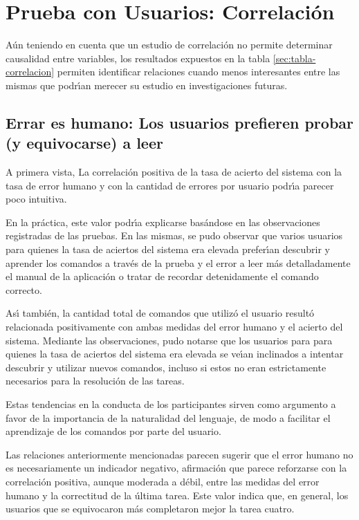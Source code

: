 \section{Prueba con Usuarios: Correlaci\'on}
A\'un teniendo en cuenta que un estudio de correlaci\'on no permite determinar causalidad
entre variables, los resultados expuestos en la tabla \ref{sec:tabla-correlacion} 
permiten identificar relaciones cuando menos interesantes entre las mismas que podr{{\'\i}}an
merecer su estudio en investigaciones futuras.

\subsection[Errar es humano: Los usuarios prefieren probar (y equivocarse) a leer]
{Errar es humano: Los usuarios prefieren probar \\ (y equivocarse) a leer}
A primera vista, La correlaci\'on positiva de la tasa de acierto del sistema con la
tasa de error humano y con la cantidad de errores por usuario podr{{\'\i}}a parecer
poco intuitiva.

En la pr\'actica, este valor podr{{\'\i}}a explicarse bas\'andose en las observaciones registradas 
de las pruebas. En las mismas, se pudo observar que varios usuarios para quienes la tasa de
aciertos del sistema era elevada prefer{{\'\i}}an descubrir y aprender los comandos a trav\'es
de la prueba y el error a leer m\'as detalladamente el manual de la aplicaci\'on o tratar de
recordar detenidamente el comando correcto.

As{{\'\i}} tambi\'en, la cantidad total de comandos que utiliz\'o el usuario result\'o relacionada
positivamente con ambas medidas del error humano y el acierto del sistema. Mediante las 
observaciones, pudo notarse que los usuarios para para quienes la tasa de
aciertos del sistema era elevada se ve{{\'\i}}an inclinados a intentar descubrir y utilizar nuevos
comandos, incluso si estos no eran estrictamente necesarios para la resoluci\'on de las tareas.

Estas tendencias en la conducta de los participantes sirven como argumento a favor de la importancia 
de la naturalidad del lenguaje, de modo a facilitar el aprendizaje de los comandos por parte del usuario.

Las relaciones anteriormente mencionadas parecen sugerir que el error humano no es necesariamente
un indicador negativo, afirmaci\'on que parece reforzarse con la correlaci\'on positiva, aunque moderada
a d\'ebil, entre las medidas del error humano y la correctitud de la \'ultima tarea. Este valor
indica que, en general, los usuarios que se equivocaron m\'as completaron mejor la tarea cuatro.

